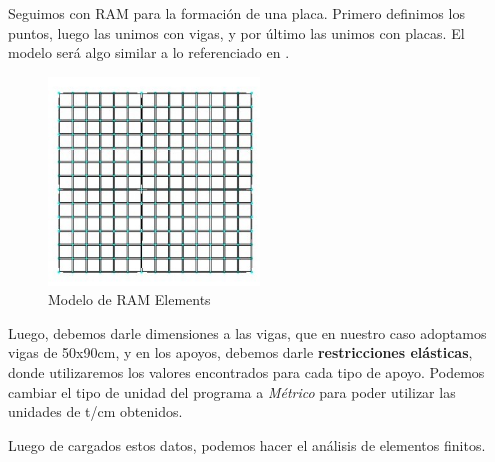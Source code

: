 \documentclass[../main.tex]{subfiles}
\begin{document}
Seguimos con RAM para la formación de una placa. Primero definimos los puntos,
luego las unimos con vigas, y por último las unimos con placas. El modelo será
algo similar a lo referenciado en .

\begin{figure}[htpb]
  \centering
  \includegraphics[width=0.5\textwidth]{../images/20210421/ej1_ram1}
  \caption{Modelo de RAM Elements}
  \label{fig:ej1-ram1}
\end{figure}

Luego, debemos darle dimensiones a las vigas, que en nuestro caso adoptamos
vigas de 50x90cm, y en los apoyos, debemos darle \textbf{restricciones elásticas},
donde utilizaremos los valores encontrados para cada tipo de apoyo. Podemos cambiar
el tipo de unidad del programa a \textit{Métrico} para poder utilizar las unidades
de t/cm obtenidos.

Luego de cargados estos datos, podemos hacer el análisis de elementos finitos. 
\end{document}

